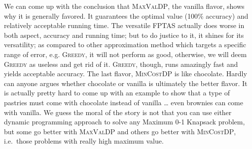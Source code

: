 \documentclass[12pt, oneside]{book}
\begin{document}
We can come up with the conclusion that \textsc{MaxValDP}, the vanilla
flavor, shows why it is generally favored. It guarantees the optimal
value (100\% accuracy) and relatively acceptable running time. The
versatile \textsc{FPTAS} actually does worse in both aspect, accuracy
and running time; but to do justice to it, it shines for its
versatility; as compared to other approximation method which targets a
specific range of error, e.g. \textsc{Greedy}, it will not perform as
good, otherwise, we will deem \textsc{Greedy} as useless and get rid of
it. \textsc{Greedy}, though, runs amazingly fast and yields acceptable
accuracy. The last flavor, \textsc{MinCostDP} is like chocolate. Hardly
can anyone argues whether chocolate or vanilla is ultimately the better
flavor. It is actually pretty hard to come up with an example to show
that a type of pastries must come with chocolate instead of vanilla
\ldots{} even brownies can come with vanilla. We guess the moral of the
story is not that you can use either dynamic programming approach to
solve any Maximum 0-1 Knapsack problem, but some go better with
\textsc{MaxValDP} and others go better with \textsc{MinCostDP},
i.e.~those problems with really high maximum value.


\end{document}

